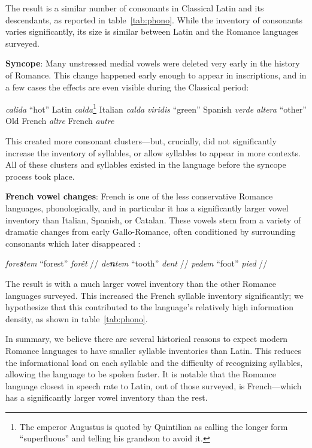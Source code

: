 \documentclass[12pt,twoside]{article}
\newcommand{\ipa}[1]{/\textipa{#1}/}
\newcommand{\yields}{\textrightarrow}
\begin{document}
The result is a similar number of consonants in Classical Latin and its descendants, as reported in table~\ref{tab:phono}. While the inventory of consonants varies significantly, its size is similar between Latin and the Romance languages surveyed.

\textbf{Syncope}: Many unstressed medial vowels were deleted very early in the history of Romance. This change happened early enough to appear in inscriptions, and in a few cases the effects are even visible during the Classical period:

\begin{exe}
\ex \emph{calida} ``hot'' \yields{} Latin \emph{calda}\footnote{The emperor Augustus is quoted by Quintilian \citep[I.6.19]{quintilian} as calling the longer form ``superfluous'' and telling his grandson to avoid it.} \yields{} Italian \emph{calda}
\ex \emph{viridis} ``green'' \yields{} Spanish \emph{verde}
\ex \emph{altera} ``other'' \yields{} Old French \emph{altre} \yields{} French \emph{autre}
\end{exe}

This created more consonant clusters---but, crucially, did not significantly increase the inventory of syllables, or allow syllables to appear in more contexts. All of these clusters and syllables existed in the language before the syncope process took place.

\textbf{French vowel changes}: French is one of the less conservative Romance languages, phonologically, and in particular it has a significantly larger vowel inventory than Italian, Spanish, or Catalan. These vowels stem from a variety of dramatic changes from early Gallo-Romance, often conditioned by surrounding consonants which later disappeared \citep{pope}:

\begin{exe}
\ex \emph{fore\textbf{s}tem} ``forest'' \yields{} \emph{for\^et} \ipa{fOKE}
\ex \emph{de\textbf{n}tem} ``tooth'' \yields{} \emph{dent} \ipa{d\~A}
\ex \emph{pedem} ``foot'' \yields{} \emph{pied} \ipa{pje}
\end{exe}

The result is with a much larger vowel inventory than the other Romance languages surveyed. This increased the French syllable inventory significantly; we hypothesize that this contributed to the language's relatively high information density, as shown in table~\ref{tab:phono}.

In summary, we believe there are several historical reasons to expect modern Romance languages to have smaller syllable inventories than Latin. This reduces the informational load on each syllable and the difficulty of recognizing syllables, allowing the language to be spoken faster. It is notable that the Romance language closest in speech rate to Latin, out of those surveyed, is French---which has a significantly larger vowel inventory than the rest.
\end{document}
